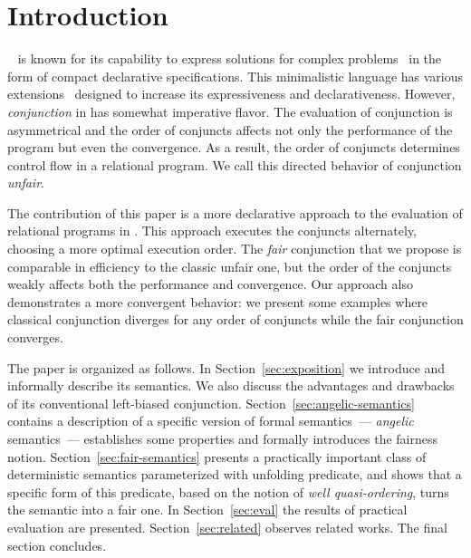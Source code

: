 \section{Introduction}
\label{sec:intro}

\mk~\cite{fair:TheReasonedSchemer,fair:micro} is known for its capability to express solutions for complex problems~\cite{fair:seven,fair:quines,fair:theorem-prover}
in the form of compact declarative specifications. This minimalistic language has various extensions~\cite{fair:CKanren,fair:WillThesis,fair:alphaKanren,fair:Guided}
designed to increase its expressiveness and declarativeness. However, \emph{conjunction} in \mk has somewhat imperative flavor. The evaluation of conjunction is asymmetrical
and the order of conjuncts affects not only the performance of the program but even the convergence. As a result, the order of conjuncts determines control flow in
a relational program. We call this directed behavior of conjunction \textit{unfair}.

The contribution of this paper is a more declarative approach to the evaluation of relational programs in \mk. This approach executes the conjuncts alternately, choosing
a more optimal execution order. The \emph{fair} conjunction that we propose is comparable in efficiency to the classic unfair one, but the order of the conjuncts weakly
affects both the performance and convergence. Our approach also demonstrates a more convergent behavior: we present some examples where classical conjunction diverges for
any order of conjuncts while the fair conjunction converges.

The paper is organized as follows. In Section~\ref{sec:exposition} we introduce \mk and informally describe its semantics. We also discuss the advantages and drawbacks of its
conventional left-biased  conjunction. Section~\ref{sec:angelic-semantics} contains a description of a specific version of \mk formal semantics~--- \emph{angelic} semantics~---
establishes some properties and formally introduces the fairness notion. Section~\ref{sec:fair-semantics} presents a practically important class of deterministic semantics
parameterized with unfolding predicate, and shows that a specific form of this predicate, based on the notion of \emph{well quasi-ordering}, turns the semantic into a fair one.
In Section~\ref{sec:eval} the results of practical evaluation are presented. Section~\ref{sec:related} observes related works. The final section concludes.

